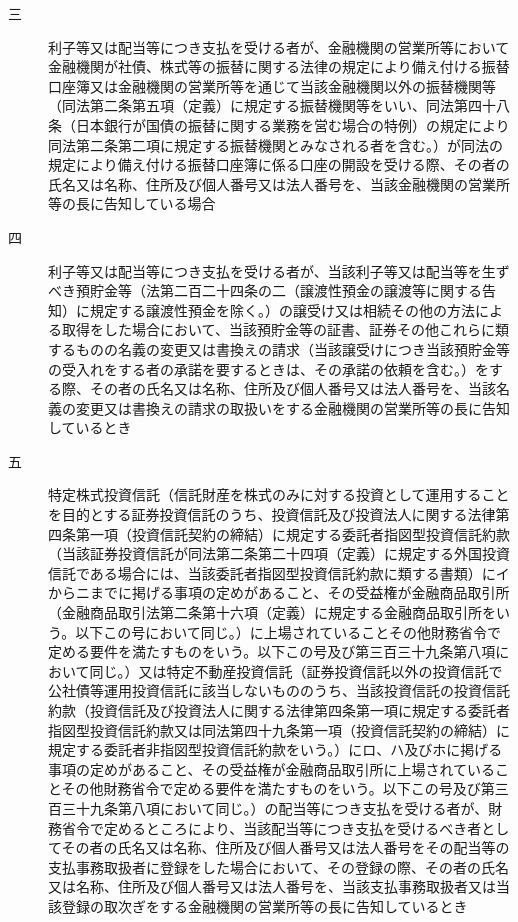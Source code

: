 \documentclass[twocolumn,a4j,10pt]{ltjtarticle}
\begin{document}
\begin{description}
\begin{description}
\item[三]利子等又は配当等につき支払を受ける者が、金融機関の営業所等において金融機関が社債、株式等の振替に関する法律の規定により備え付ける振替口座簿又は金融機関の営業所等を通じて当該金融機関以外の振替機関等（同法第二条第五項（定義）に規定する振替機関等をいい、同法第四十八条（日本銀行が国債の振替に関する業務を営む場合の特例）の規定により同法第二条第二項に規定する振替機関とみなされる者を含む。）が同法の規定により備え付ける振替口座簿に係る口座の開設を受ける際、その者の氏名又は名称、住所及び個人番号又は法人番号を、当該金融機関の営業所等の長に告知している場合
\item[四]利子等又は配当等につき支払を受ける者が、当該利子等又は配当等を生ずべき預貯金等（法第二百二十四条の二（譲渡性預金の譲渡等に関する告知）に規定する譲渡性預金を除く。）の譲受け又は相続その他の方法による取得をした場合において、当該預貯金等の証書、証券その他これらに類するものの名義の変更又は書換えの請求（当該譲受けにつき当該預貯金等の受入れをする者の承諾を要するときは、その承諾の依頼を含む。）をする際、その者の氏名又は名称、住所及び個人番号又は法人番号を、当該名義の変更又は書換えの請求の取扱いをする金融機関の営業所等の長に告知しているとき
\item[五]特定株式投資信託（信託財産を株式のみに対する投資として運用することを目的とする証券投資信託のうち、投資信託及び投資法人に関する法律第四条第一項（投資信託契約の締結）に規定する委託者指図型投資信託約款（当該証券投資信託が同法第二条第二十四項（定義）に規定する外国投資信託である場合には、当該委託者指図型投資信託約款に類する書類）にイからニまでに掲げる事項の定めがあること、その受益権が金融商品取引所（金融商品取引法第二条第十六項（定義）に規定する金融商品取引所をいう。以下この号において同じ。）に上場されていることその他財務省令で定める要件を満たすものをいう。以下この号及び第三百三十九条第八項において同じ。）又は特定不動産投資信託（証券投資信託以外の投資信託で公社債等運用投資信託に該当しないもののうち、当該投資信託の投資信託約款（投資信託及び投資法人に関する法律第四条第一項に規定する委託者指図型投資信託約款又は同法第四十九条第一項（投資信託契約の締結）に規定する委託者非指図型投資信託約款をいう。）にロ、ハ及びホに掲げる事項の定めがあること、その受益権が金融商品取引所に上場されていることその他財務省令で定める要件を満たすものをいう。以下この号及び第三百三十九条第八項において同じ。）の配当等につき支払を受ける者が、財務省令で定めるところにより、当該配当等につき支払を受けるべき者としてその者の氏名又は名称、住所及び個人番号又は法人番号をその配当等の支払事務取扱者に登録をした場合において、その登録の際、その者の氏名又は名称、住所及び個人番号又は法人番号を、当該支払事務取扱者又は当該登録の取次ぎをする金融機関の営業所等の長に告知しているとき

\end{description}
\end{description}
\end{document}
